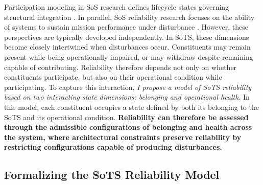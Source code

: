 Participation modeling  in SoS research defines lifecycle states governing structural integration \cite{axelsson2019refined, svenson2020situation, hristozov2023modeling}. In parallel, SoS reliability research focuses on the ability of systems to sustain mission performance under disturbance \cite{ferreira2024framework, uday2015designing, garro2014reliability, li2025reliability}. However, these perspectives are typically developed independently.
In SoTS, these dimensions become closely intertwined when disturbances occur. Constituents may remain present while being operationally impaired, or may withdraw despite remaining capable of contributing. Reliability therefore depends not only on whether constituents participate, but also on their operational condition while participating.
To capture this interaction, \emph{I propose a model of SoTS reliability based on two interacting state dimensions: belonging and operational health}. In this model, each constituent occupies a state defined by both its belonging to the SoTS and its operational condition.
\textbf{Reliability can therefore be assessed through the admissible configurations of belonging and health across the system, where architectural constraints preserve reliability by restricting configurations capable of producing disturbances.} 

\subsection{Formalizing the SoTS Reliability Model}



